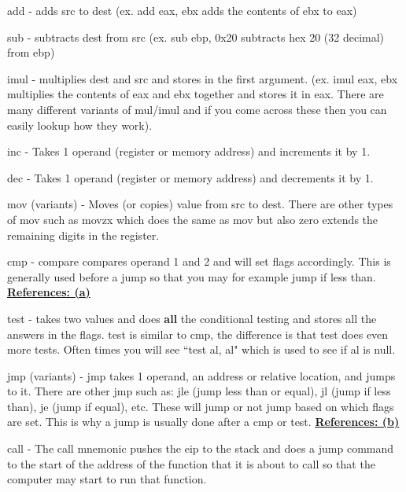 \documentclass{report}
\begin{document}
add - adds src to dest (ex. add eax, ebx adds the contents of ebx to eax)\newline

sub - subtracts dest from src (ex. sub ebp, 0x20 subtracts hex 20 (32 decimal) from ebp)\newline

imul - multiplies dest and src and stores in the first argument. (ex. imul eax, ebx multiplies the contents of eax and ebx together and stores it in eax. There are many different variants of mul/imul and if you come across these then you can easily lookup how they work). \newline

inc - Takes 1 operand (register or memory address) and increments it by 1.\newline

dec - Takes 1 operand (register or memory address) and decrements it by 1.\newline

mov (variants) - Moves (or copies) value from src to dest.  There are other types of mov such as movzx which does the same as mov but also zero extends the remaining digits in the register.\newline

cmp - compare compares operand 1 and 2 and will set flags accordingly.  This is generally used before a jump so that you may for example jump if less than. \hyperref[ref:2]{\textbf{References: (a)}} \newline

test - takes two values and does \textbf{all} the conditional testing and stores all the answers in the flags. test is similar to cmp, the difference is that test does even more tests.  Often times you will see ``test al, al" which is used to see if al is null.\newline

jmp (variants) - jmp takes 1 operand, an address or relative location, and jumps to it. There are other jmp such as: jle (jump less than or equal), jl (jump if less than), je (jump if equal), etc. These will jump or not jump based on which flags are set.  This is why a jump is usually done after a cmp or test. \hyperref[ref:2]{\textbf{References: (b)}} \newline

call - The call mnemonic pushes the eip to the stack and does a jump command to the start of the address of the function that it is about to call so that the computer may start to run that function. \newline
\end{document}

